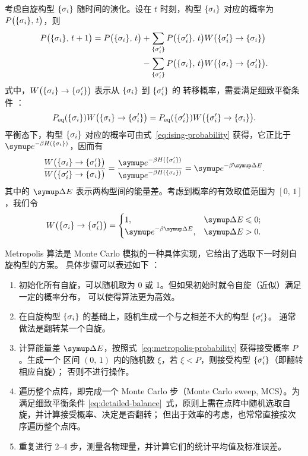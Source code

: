 考虑自旋构型 ${\{\sigma_i\}}$ 随时间的演化。设在 $t$ 时刻，构型 ${\{\sigma_i\}}$ 对应的概率为
$P\qty\big({\{\sigma_i\}},\,t)$，则 \cite{pathria,landau2005guide}
\begin{align}
  P\qty\big({\{\sigma_i\}},\,t+1) = P\qty\big({\{\sigma_i\}},\,t)
  &+ \sum_{{\{\sigma'_i\}}} P\qty\big({\{\sigma'_i\}},\,t) W\qty\big({\{\sigma'_i\}}\to{\{\sigma_i\}})
     \notag \\
  &- \sum_{{\{\sigma'_i\}}} P\qty\big({\{\sigma_i\}},\,t)  W\qty\big({\{\sigma_i\}}\to{\{\sigma'_i\}}).
\end{align}
式中，$W\qty\big({\{\sigma_i\}}\to{\{\sigma'_i\}})$ 表示从 ${\{\sigma_i\}}$ 到 ${\{\sigma'_i\}}$ 的
转移概率，需要满足细致平衡条件 \cite{pathria,landau2005guide}：
\begin{equation}
  \label{eq:detailed-balance}
    P_{\text{eq}}({\{\sigma_i\}})  W\qty\big({\{\sigma_i\}}\to{\{\sigma'_i\}})
  = P_{\text{eq}}({\{\sigma'_i\}}) W\qty\big({\{\sigma'_i\}}\to{\{\sigma_i\}}).
\end{equation}
平衡态下，构型 ${\{\sigma_i\}}$ 对应的概率可由式~\eqref{eq:ising-probability} 获得，它正比于
$\ee^{-\beta H(\q{\sigma_i})}$，因而有
\begin{equation}
    \frac{W\qty\big(\q{\sigma_i}\to\q{\sigma'_i})}{W\qty\big(\q{\sigma'_i}\to\q{\sigma_i})}
  = \frac{\ee^{-\beta H(\q{\sigma'_i})}}{\ee^{-\beta H(\q{\sigma_i})}}
  = \ee^{-\beta \incr{E}}.
\end{equation}
其中的 $\incr{E}$ 表示两构型间的能量差。考虑到概率的有效取值范围为 $[0,\,1]$，我们令
\begin{equation}
  \label{eq:metropolis-probability}
  W\qty\big(\q{\sigma_i}\to\q{\sigma'_i}) =
  \begin{cases}
    1, & \incr{E} \leqslant 0; \\
    \ee^{-\beta \incr{E}}, & \incr{E} > 0. \\
  \end{cases}
\end{equation}

Metropolis 算法是 Monte Carlo 模拟的一种具体实现，它给出了选取下一时刻自旋构型的方案。
具体步骤可以表述如下 \cite{pathria,landau2005guide,binder2010monte}：

\begin{enumerate}
  \item 初始化所有自旋，可以随机取为 0 或 1。但如果初始时就令自旋（近似）满足一定的概率分布，
    可以使得算法更为高效。
  \item 在自旋构型 ${\{\sigma_i\}}$ 的基础上，随机生成一个与之相差不大的构型 ${\{\sigma'_i\}}$。
    通常做法是翻转某一个自旋。
  \item 计算能量差 $\incr{E}$，按照式~\eqref{eq:metropolis-probability} 获得接受概率 $P$。生成一个
    区间 $(0,\,1)$ 内的随机数 $\xi$，若 $\xi<P$，则接受构型 ${\{\sigma'_i\}}$（即翻转相应自旋）；
    否则不进行操作。
  \item 遍历整个点阵，即完成一个 Monte Carlo 步（Monte Carlo sweep, MCS）。为满足细致平衡条件
    \eqref{eq:detailed-balance}~式，原则上需在点阵中随机选取自旋，并计算接受概率、决定是否翻转；
    但出于效率的考虑，也常常直接按次序遍历整个点阵。
  \item 重复进行 2--4 步，测量各物理量，并计算它们的统计平均值及标准误差。
\end{enumerate}

